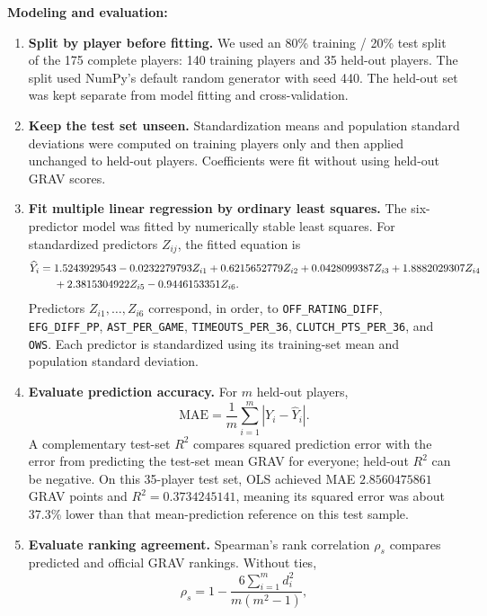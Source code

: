 \documentclass[11pt]{article}
\begin{document}
\textbf{Modeling and evaluation:}
\begin{enumerate}
\item \textbf{Split by player before fitting.} We used an 80\% training /
20\% test split of the 175 complete players: 140 training players and
35 held-out players. The split used NumPy's default random generator with
seed 440. The held-out set was kept separate from model fitting and
cross-validation.
\item \textbf{Keep the test set unseen.} Standardization means and
population standard deviations were computed on training players only
and then applied unchanged to held-out players. Coefficients were fit
without using held-out GRAV scores.
\item \textbf{Fit multiple linear regression by ordinary least squares.}
The six-predictor model was fitted by numerically stable least squares.
For standardized predictors $Z_{ij}$, the fitted equation is
\begin{align}
\widehat Y_i={}&1.5243929543
-0.0232279793Z_{i1}
+0.6215652779Z_{i2}
+0.0428099387Z_{i3}
+1.8882029307Z_{i4}\notag\\
&+2.3815304922Z_{i5}
-0.9446153351Z_{i6}.
\label{eq:fitted-ols}
\end{align}
Predictors $Z_{i1},\ldots,Z_{i6}$ correspond, in order, to
\texttt{OFF\_RATING\_DIFF}, \texttt{EFG\_DIFF\_PP},
\texttt{AST\_PER\_GAME}, \texttt{TIMEOUTS\_PER\_36},
\texttt{CLUTCH\_PTS\_PER\_36}, and \texttt{OWS}. Each predictor is
standardized using its training-set mean and population standard deviation.
\item \textbf{Evaluate prediction accuracy.} For $m$ held-out players,
\begin{equation}
 \mathrm{MAE}=\frac{1}{m}\sum_{i=1}^{m}|Y_i-\widehat Y_i|.
 \label{eq:mae}
\end{equation}
A complementary test-set $R^2$ compares squared prediction error with
the error from predicting the test-set mean GRAV for everyone; held-out
$R^2$ can be negative. On this 35-player test set, OLS achieved MAE
$2.8560475861$ GRAV points and $R^2=0.3734245141$, meaning its squared
error was about 37.3\% lower than that mean-prediction reference on this
test sample.
\item \textbf{Evaluate ranking agreement.} Spearman's rank correlation
$\rho_s$ compares predicted and official GRAV rankings. Without ties,
\begin{equation}
\rho_s=1-\frac{6\sum_{i=1}^{m}d_i^2}{m(m^2-1)},
\label{eq:spearman}
\end{equation}

\end{enumerate}
\end{document}
